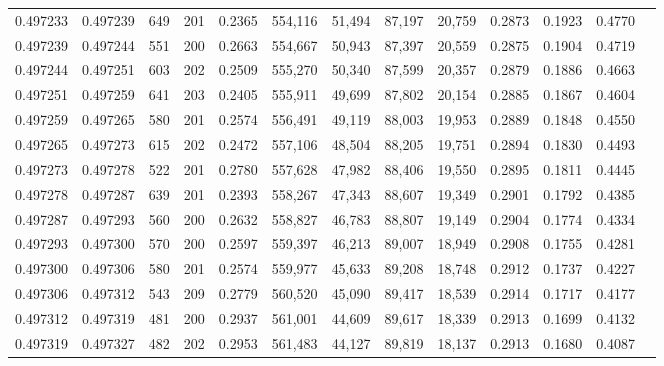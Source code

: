 \begin{tabular}{rrrrrrrrrrrrr}
0.497233 & 0.497239 &   649 & 201 &                                     0.2365 & 554,116 &  51,494 &  87,197 &  20,759 & 0.2873 & 0.1923 & 0.4770 \\
0.497239 & 0.497244 &   551 & 200 &                                     0.2663 & 554,667 &  50,943 &  87,397 &  20,559 & 0.2875 & 0.1904 & 0.4719 \\
0.497244 & 0.497251 &   603 & 202 &                                     0.2509 & 555,270 &  50,340 &  87,599 &  20,357 & 0.2879 & 0.1886 & 0.4663 \\
0.497251 & 0.497259 &   641 & 203 &                                     0.2405 & 555,911 &  49,699 &  87,802 &  20,154 & 0.2885 & 0.1867 & 0.4604 \\
0.497259 & 0.497265 &   580 & 201 &                                     0.2574 & 556,491 &  49,119 &  88,003 &  19,953 & 0.2889 & 0.1848 & 0.4550 \\
0.497265 & 0.497273 &   615 & 202 &                                     0.2472 & 557,106 &  48,504 &  88,205 &  19,751 & 0.2894 & 0.1830 & 0.4493 \\
0.497273 & 0.497278 &   522 & 201 &                                     0.2780 & 557,628 &  47,982 &  88,406 &  19,550 & 0.2895 & 0.1811 & 0.4445 \\
0.497278 & 0.497287 &   639 & 201 &                                     0.2393 & 558,267 &  47,343 &  88,607 &  19,349 & 0.2901 & 0.1792 & 0.4385 \\
0.497287 & 0.497293 &   560 & 200 &                                     0.2632 & 558,827 &  46,783 &  88,807 &  19,149 & 0.2904 & 0.1774 & 0.4334 \\
0.497293 & 0.497300 &   570 & 200 &                                     0.2597 & 559,397 &  46,213 &  89,007 &  18,949 & 0.2908 & 0.1755 & 0.4281 \\
0.497300 & 0.497306 &   580 & 201 &                                     0.2574 & 559,977 &  45,633 &  89,208 &  18,748 & 0.2912 & 0.1737 & 0.4227 \\
0.497306 & 0.497312 &   543 & 209 &                                     0.2779 & 560,520 &  45,090 &  89,417 &  18,539 & 0.2914 & 0.1717 & 0.4177 \\
0.497312 & 0.497319 &   481 & 200 &                                     0.2937 & 561,001 &  44,609 &  89,617 &  18,339 & 0.2913 & 0.1699 & 0.4132 \\
0.497319 & 0.497327 &   482 & 202 &                                     0.2953 & 561,483 &  44,127 &  89,819 &  18,137 & 0.2913 & 0.1680 & 0.4087 \\

\end{tabular}
